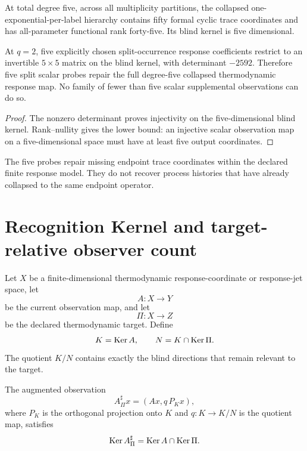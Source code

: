 \begin{theorem}\label{thm:50455}
At total degree five, across all multiplicity partitions, the collapsed one-exponential-per-label hierarchy contains fifty formal cyclic trace coordinates and has all-parameter functional rank forty-five. Its blind kernel is five dimensional.
\end{theorem}

\begin{theorem}\label{thm:five-probe}
At $q=2$, five explicitly chosen split-occurrence response coefficients restrict to an invertible $5\times5$ matrix on the blind kernel, with determinant $-2592$. Therefore five split scalar probes repair the full degree-five collapsed thermodynamic response map. No family of fewer than five scalar supplemental observations can do so.
\end{theorem}

\begin{proof}
The nonzero determinant proves injectivity on the five-dimensional blind kernel. Rank--nullity gives the lower bound: an injective scalar observation map on a five-dimensional space must have at least five output coordinates.
\end{proof}

\begin{remark}
The five probes repair missing endpoint trace coordinates within the declared finite response model. They do not recover process histories that have already collapsed to the same endpoint operator.
\end{remark}

\section{Recognition Kernel and target-relative observer count}

Let $X$ be a finite-dimensional thermodynamic response-coordinate or response-jet space, let
\[
 A:X\to Y
\]
be the current observation map, and let
\[
 \Pi:X\to Z
\]
be the declared thermodynamic target. Define
\[
 K=\operatorname{Ker} A,
 \qquad
 N=K\cap\operatorname{Ker}\Pi.
\]
The quotient $K/N$ contains exactly the blind directions that remain relevant to the target.

\begin{theorem}
The augmented observation
\[
 A_\Pi^\sharp x=(Ax,q\,P_Kx),
\]
where $P_K$ is the orthogonal projection onto $K$ and $q:K\to K/N$ is the quotient map, satisfies
\[
 \operatorname{Ker} A_\Pi^\sharp=\operatorname{Ker} A\cap\operatorname{Ker}\Pi.
\]
\end{theorem}

